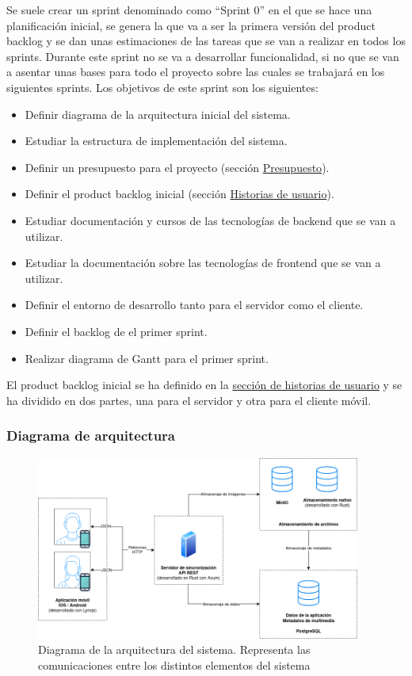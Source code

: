 Se suele crear un sprint denominado como ``Sprint 0'' en el que se hace una planificación inicial, se genera la que va a ser la primera versión del product backlog y se dan unas estimaciones de las tareas que se van a realizar en todos los sprints.
Durante este sprint no se va a desarrollar funcionalidad, si no que se van a asentar unas bases para todo el proyecto sobre las cuales se trabajará en los siguientes sprints.
Los objetivos de este sprint son los siguientes:

\begin{itemize}
    \item Definir diagrama de la arquitectura inicial del sistema.
    \item Estudiar la estructura de implementación del sistema.
    \item Definir un presupuesto para el proyecto (sección \hyperref[sec:presupuesto]{Presupuesto}).
    \item Definir el product backlog inicial (sección \hyperref[sec:historias-de-usuario]{Historias de usuario}).
    \item Estudiar documentación y cursos de las tecnologías de backend que se van a utilizar.
    \item Estudiar la documentación sobre las tecnologías de frontend que se van a utilizar.
    \item Definir el entorno de desarrollo tanto para el servidor como el cliente.
    \item Definir el backlog de el primer sprint.
    \item Realizar diagrama de Gantt para el primer sprint.
\end{itemize}

El product backlog inicial se ha definido en la \hyperref[sec:historias-de-usuario]{sección de historias de usuario} y se ha dividido en dos partes, una para el servidor y otra para el cliente móvil.

\subsubsection{Diagrama de arquitectura}
\begin{figure}[H]
    \begin{center}
        \includegraphics[width=0.95\textwidth]{images/diagrama-arquitectura.png}
    \end{center}
    \caption{Diagrama de la arquitectura del sistema. Representa las comunicaciones entre los distintos elementos del sistema}\label{fig:diagrama-arquitectura}
\end{figure}


